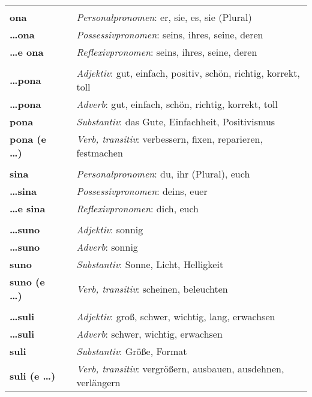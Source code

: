 \begin{supertabular}{p{2,5cm}|ll}
 && \\ %
%
\textbf{ona} && \textit{Personalpronomen}: er, sie, es, sie (Plural)  \\ %
\textbf{\dots ona} && \textit{Possessivpronomen}: seins, ihres, seine, deren \\  %
\textbf{\dots e ona} && \textit{Reflexivpronomen}: seins, ihres, seine, deren \\  
 && \\ %
%
\textbf{\dots pona} && \textit{Adjektiv}: gut, einfach, positiv, schön, richtig, korrekt, toll \\ %
\textbf{\dots pona} && \textit{Adverb}: gut, einfach, schön, richtig, korrekt, toll \\ %
\textbf{pona} && \textit{Substantiv}: das Gute, Einfachheit, Positivismus \\ %
\textbf{pona (e \dots)} && \textit{Verb, transitiv}: verbessern, fixen, reparieren, festmachen \\ %
 && \\ %
%
\textbf{sina} && \textit{Personalpronomen}: du, ihr (Plural), euch  \\ %
\textbf{\dots sina} && \textit{Possessivpronomen}: deins, euer  \\  %
\textbf{\dots e sina} && \textit{Reflexivpronomen}: dich, euch  \\  
 && \\ %
%
\textbf{\dots suno} && \textit{Adjektiv}: sonnig \\ %
\textbf{\dots suno} && \textit{Adverb}: sonnig \\ %
\textbf{suno} && \textit{Substantiv}: Sonne, Licht, Helligkeit \\ %
\textbf{suno (e \dots)} && \textit{Verb, transitiv}: scheinen, beleuchten \\ %
 && \\ %
%
\textbf{\dots suli} && \textit{Adjektiv}: groß, schwer, wichtig, lang, erwachsen \\ %
\textbf{\dots suli} && \textit{Adverb}: schwer, wichtig, erwachsen \\ %
\textbf{suli} && \textit{Substantiv}: Größe, Format \\ %
\textbf{suli (e \dots)} && \textit{Verb, transitiv}: vergrößern, ausbauen, ausdehnen, verlängern \\ %

\end{supertabular}
